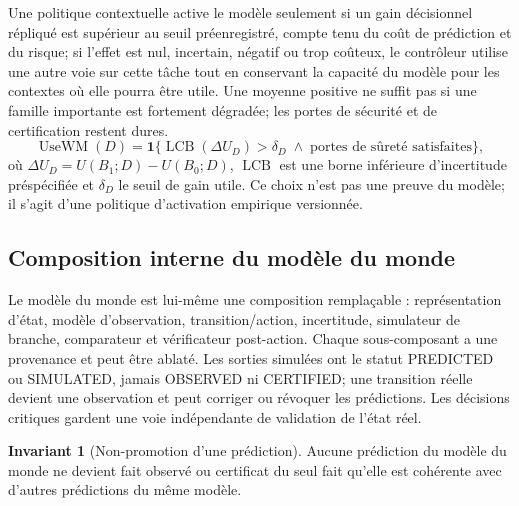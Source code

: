 \documentclass[11pt,a4paper]{article}
\newcommand{\kw}[1]{\textsf{#1}}
\theoremstyle{definition}
\newtheorem{invariant}[definition]{Invariant}
\theoremstyle{plain}
\theoremstyle{remark}
\begin{document}
Une politique contextuelle active le modèle seulement si un gain décisionnel répliqué est supérieur au seuil préenregistré, compte tenu du coût de prédiction et du risque; si l'effet est nul, incertain, négatif ou trop coûteux, le contrôleur utilise une autre voie sur cette tâche tout en conservant la capacité du modèle pour les contextes où elle pourra être utile. Une moyenne positive ne suffit pas si une famille importante est fortement dégradée; les portes de sécurité et de certification restent dures.
\[
\operatorname{UseWM}(D)=\mathbf{1}\{\operatorname{LCB}(\Delta U_D)>\delta_D\;\land\;\text{portes de sûreté satisfaites}\},
\]
où \(\Delta U_D=U(B_1;D)-U(B_0;D)\), \(\operatorname{LCB}\) est une borne inférieure d'incertitude préspécifiée et \(\delta_D\) le seuil de gain utile. Ce choix n'est pas une preuve du modèle; il s'agit d'une politique d'activation empirique versionnée.

\subsection{Composition interne du modèle du monde}
Le modèle du monde est lui-même une composition remplaçable : représentation d'état, modèle d'observation, transition/action, incertitude, simulateur de branche, comparateur et vérificateur post-action. Chaque sous-composant a une provenance et peut être ablaté. Les sorties simulées ont le statut \kw{PREDICTED} ou \kw{SIMULATED}, jamais \kw{OBSERVED} ni \kw{CERTIFIED}; une transition réelle devient une observation et peut corriger ou révoquer les prédictions. Les décisions critiques gardent une voie indépendante de validation de l'état réel.

\begin{invariant}[Non-promotion d'une prédiction]
Aucune prédiction du modèle du monde ne devient fait observé ou certificat du seul fait qu'elle est cohérente avec d'autres prédictions du même modèle.
\end{invariant}
\end{document}
